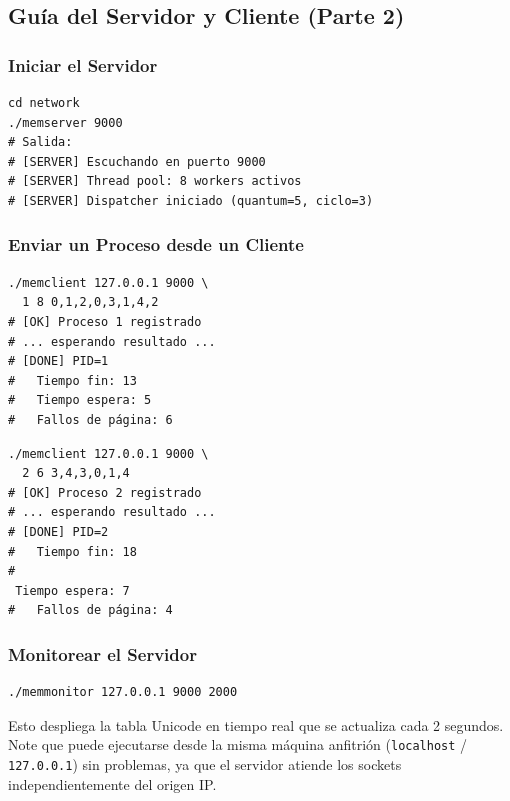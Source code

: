 \documentclass[12pt,letterpaper]{article}
\begin{document}
\subsection{Guía del Servidor y Cliente (Parte 2)}

\subsubsection{Iniciar el Servidor}
\begin{tcolorbox}[terminalbox, title={Terminal del Servidor}]
\begin{verbatim}
cd network
./memserver 9000
# Salida:
# [SERVER] Escuchando en puerto 9000
# [SERVER] Thread pool: 8 workers activos
# [SERVER] Dispatcher iniciado (quantum=5, ciclo=3)
\end{verbatim}
\end{tcolorbox}

\subsubsection{Enviar un Proceso desde un Cliente}
\begin{minipage}[t]{0.48\textwidth}
\begin{tcolorbox}[terminalbox, title={Terminal A (Nodo 1)}]
\begin{verbatim}
./memclient 127.0.0.1 9000 \
  1 8 0,1,2,0,3,1,4,2
# [OK] Proceso 1 registrado
# ... esperando resultado ...
# [DONE] PID=1
#   Tiempo fin: 13
#   Tiempo espera: 5
#   Fallos de página: 6
\end{verbatim}
\end{tcolorbox}
\end{minipage}\hfill
\begin{minipage}[t]{0.48\textwidth}
\begin{tcolorbox}[terminalbox, title={Terminal B (Nodo 2)}]
\begin{verbatim}
./memclient 127.0.0.1 9000 \
  2 6 3,4,3,0,1,4
# [OK] Proceso 2 registrado
# ... esperando resultado ...
# [DONE] PID=2
#   Tiempo fin: 18
#
 Tiempo espera: 7
#   Fallos de página: 4
\end{verbatim}
\end{tcolorbox}
\end{minipage}

\subsubsection{Monitorear el Servidor}
\begin{tcolorbox}[terminalbox, title={Terminal del Monitor}]
\begin{verbatim}
./memmonitor 127.0.0.1 9000 2000
\end{verbatim}
\end{tcolorbox}
Esto despliega la tabla Unicode en tiempo real que se actualiza cada 2 segundos.
Note que puede ejecutarse desde la misma máquina anfitrión (\texttt{localhost} / \texttt{127.0.0.1}) sin problemas, ya que el servidor atiende los sockets independientemente del origen IP.
\end{document}
